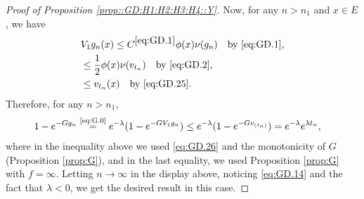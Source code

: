 \documentclass[12pt,a4paper]{amsart}
\numberwithin{equation}{section}
\theoremstyle{plain}
\theoremstyle{definition}
\theoremstyle{remark}
\begin{document}
\begin{proof}[Proof of Proposition \ref{prop::GD:H1:H2:H3:H4::Y}]
	Now, for any $n>n_1$ and $x\in E$, we have
\begin{align}
	& V_1g_n(x) \leq C^{\eqref{eq:GD.1}} \phi(x)\nu(g_n)\quad\text{by \eqref{eq:GD.1}},
	\\& \leq \frac{1}{2}\phi(x)\nu(v_{t_n})\quad\text{by \eqref{eq:GD.2}},
	\\\label{eq:GD.26} & \leq v_{t_n}(x)\quad\text{by \eqref{eq:GD.25}}.
\end{align}
	Therefore, for any $n>n_1$,
\begin{align}
	& 1 - e^{- Gg_n}
	\overset{\text{\eqref{eq:G.0}}}= e^{- \lambda} (1- e^{- GV_1g_n})
	\leq e^{- \lambda} (1- e^{- G v_{(t_n)}})
	= e^{- \lambda} e^{\lambda t_n},
\end{align}
	where in the inequality above we used \eqref{eq:GD.26} and the monotonicity of $G$ (Proposition \ref{prop:G}), and in the last equality, we used Proposition \ref{prop:G} with $f = \infty$.
	Letting $n\to \infty$ in the display above, noticing \eqref{eq:GD.14} and the fact that $\lambda < 0$,
	we get the desired result in this case.


\end{proof}
\end{document}
